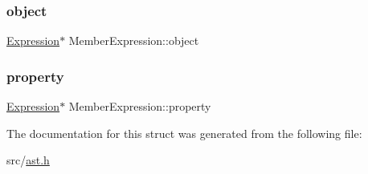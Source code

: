 \subsubsection{\texorpdfstring{object}{object}}
{\footnotesize\ttfamily \hyperlink{struct_expression}{Expression}$\ast$ Member\+Expression\+::object}

\mbox{\label{struct_member_expression_a7b33bb4629162523bddbb397b180e31e}} 
\subsubsection{\texorpdfstring{property}{property}}
{\footnotesize\ttfamily \hyperlink{struct_expression}{Expression}$\ast$ Member\+Expression\+::property}



The documentation for this struct was generated from the following file\+:\begin{DoxyCompactItemize}
\item 
src/\hyperlink{ast_8h}{ast.\+h}\end{DoxyCompactItemize}
